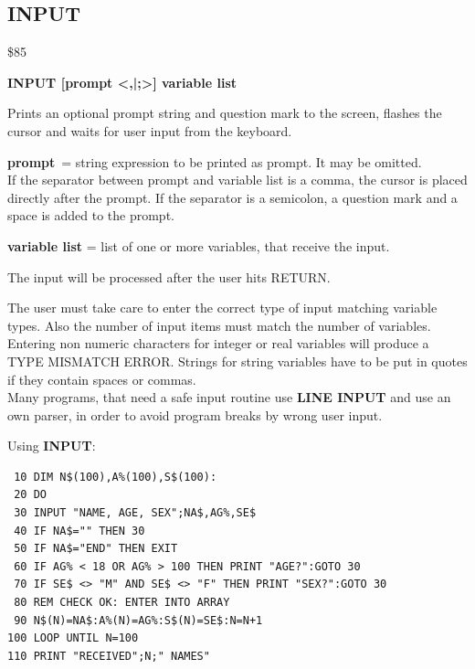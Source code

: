 \subsection{INPUT}
\begin{description}[leftmargin=2cm,style=nextline]
\item [Token:] \$85
\item [Format:] {\bf INPUT [prompt <,|;>] variable list}
\item [Usage:] Prints an optional
               prompt string and question mark to the screen,
               flashes the cursor and waits for user input
               from the keyboard.

               {\bf prompt} = string expression to be printed
               as prompt. It may be omitted. \\
               If the separator between prompt and variable list
               is a comma, the cursor is placed directly after
               the prompt. If the separator is a semicolon,
               a question mark and a space is added to the prompt.

               {\bf variable list} = list of one or more
               variables, that receive the input.

               The input will be processed after the user hits RETURN.

\item [Remarks:] The user must take care to enter the correct
               type of input matching variable types.
               Also the number of input items must match the number
               of variables.
               Entering non numeric characters for integer or real
               variables will produce a TYPE MISMATCH ERROR.
               Strings for string variables have to be put in quotes
               if they contain spaces or commas. \\
               Many programs, that need a safe input routine use
               {\bf LINE INPUT} and use an own parser, in order
               to avoid program breaks by wrong user input.

\item [Example:] Using {\bf INPUT}:
\begin{tcolorbox}[colback=black,coltext=white]
\verbatimfont{\codefont}
\begin{verbatim}
 10 DIM N$(100),A%(100),S$(100):
 20 DO
 30 INPUT "NAME, AGE, SEX";NA$,AG%,SE$
 40 IF NA$="" THEN 30
 50 IF NA$="END" THEN EXIT
 60 IF AG% < 18 OR AG% > 100 THEN PRINT "AGE?":GOTO 30
 70 IF SE$ <> "M" AND SE$ <> "F" THEN PRINT "SEX?":GOTO 30
 80 REM CHECK OK: ENTER INTO ARRAY
 90 N$(N)=NA$:A%(N)=AG%:S$(N)=SE$:N=N+1
100 LOOP UNTIL N=100
110 PRINT "RECEIVED";N;" NAMES"
\end{verbatim}
\end{tcolorbox}
\end{description}

